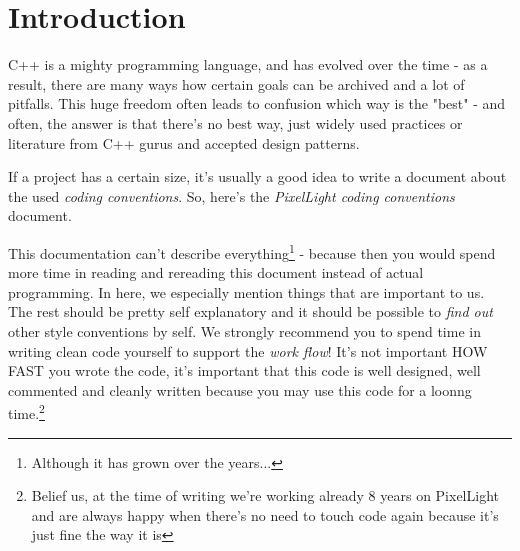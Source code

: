 \chapter{Introduction}
C++ is a mighty programming language, and has evolved over the time - as a result, there are many ways how certain goals can be archived and a lot of pitfalls. This huge freedom often leads to confusion which way is the "best" - and often, the answer is that there's no best way, just widely used practices or literature from C++ gurus and accepted design patterns.

If a project has a certain size, it's usually a good idea to write a document about the used \emph{coding conventions}. So, here's the \emph{PixelLight coding conventions} document.

This documentation can't describe everything\footnote{Although it has grown over the years...} - because then you would spend more time in reading and rereading this document instead of actual programming. In here, we especially mention things that are important to us. The rest should be pretty self explanatory and it should be possible to \emph{find out} other style conventions by self. We strongly recommend you to spend time in writing clean code yourself to support the \emph{work flow}! It's not important HOW FAST you wrote the code, it's important that this code is well designed, well commented and cleanly written because you may use this code for a loonng time.\footnote{Belief us, at the time of writing we're working already 8 years on PixelLight and are always happy when there's no need to touch code again because it's just fine the way it is}
